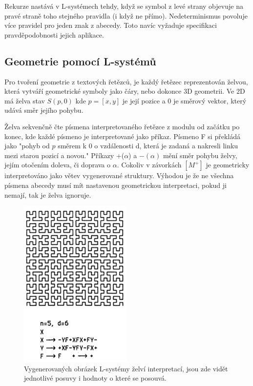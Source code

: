 Rekurze nastává v L-systémech tehdy, když se symbol z levé strany objevuje na pravé straně toho stejného pravidla (i když ne přímo). Nedeterminismus povoluje více pravidel pro jeden znak z abecedy. Toto navíc vyžaduje specifikaci pravděpodobnosti jejich aplikace.\cite{LINDENMAYER1968280}

\subsection{Geometrie pomocí L-systémů}
\label{lsystemGeometry}
Pro tvoření geometrie z textových řetězců, je každý řetězec reprezentován želvou, která vytváří geometrické symboly jako čáry, nebo dokonce 3D geometrii.
Ve 2D má želva stav $S(p,0)$ kde $p=[x,y]$ je její pozice a $0$ je směrový vektor, který udává směr jejího pohybu. 

Želva sekvenčně čte písmena interpretovaného řetězce z modulu od začátku po konec, kde každé písmeno je interpretované jako příkaz. Písmeno F si překládá jako "pohyb od $p$ směrem k $0$ o vzdálenosti d, která je zadaná a nakresli linku mezi starou pozicí a novou." Příkazy +($\alpha$) a $-(\alpha)$ mění směr pohybu želvy, jejím otočením doleva, či doprava o $\alpha$. Cokoliv v závorkách $[M^+]$ je geometricky interpretováno jako větev vygenerované struktury. Výhodou je že ne všechna písmena abecedy musí mít nastavenou geometrickou interpretaci, pokud ji nemají, tak je želva ignoruje.
\cite{prusinkiewicz1986graphical}

\begin{figure}[H]
	\centering
	\includegraphics[scale=1]{obrazky-figures/L-system.png}
	\caption[L-system]{Vygenerovaných obrázek L-systémy želví interpretací, jsou zde vidět jednotlivé posuvy i hodnoty o které se posouvá.}
\end{figure}
\newpage

